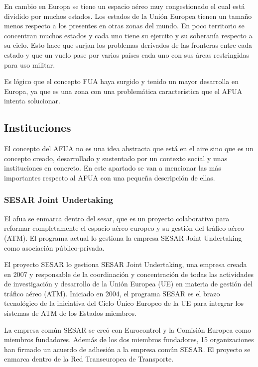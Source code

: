 En cambio en Europa se tiene un espacio aéreo muy congestionado el cual está dividido por muchos estados. Los estados de la Unión Europea tienen un tamaño menos respecto a los presentes en otras zonas del mundo. En poco territorio se concentran muchos estados y cada uno tiene su ejercito y su soberanía respecto a su cielo. Esto hace que surjan los problemas derivados de las fronteras entre cada estado y que un vuelo pase por varios países cada uno con sus áreas restringidas para uso militar.

Es lógico que el concepto FUA haya surgido y tenido un mayor desarrolla en Europa, ya que es una zona con una problemática característica que el AFUA intenta solucionar.

\subsection{Instituciones}

El concepto del AFUA no es una idea abstracta que está en el aire sino que es un concepto creado, desarrollado y sustentado por un contexto social y unas instituciones en concreto. En este apartado se van a mencionar las más importantes respecto al AFUA con una pequeña descripción de ellas.

\subsubsection{SESAR Joint Undertaking}

El \acrfull{afua} se enmarca dentro del \acrfull{sesar}, que es un proyecto colaborativo para reformar completamente el espacio aéreo europeo y su gestión del tráfico aéreo (ATM). El programa actual lo gestiona la empresa SESAR Joint Undertaking como asociación público-privada.

El proyecto SESAR lo gestiona SESAR Joint Undertaking, una empresa creada en 2007 y  responsable de la coordinación y concentración de todas las actividades de investigación y desarrollo de la Unión Europea (UE) en materia de gestión del tráfico aéreo (ATM). Iniciado en 2004, el programa SESAR es el brazo tecnológico de la iniciativa del Cielo Único Europeo de la UE para integrar los sistemas de ATM de los Estados miembros.

La empresa común SESAR se creó con Eurocontrol y la Comisión Europea como miembros fundadores. Además de los dos miembros fundadores, 15 organizaciones han firmado un acuerdo de adhesión a la empresa común SESAR. El proyecto se enmarca dentro de la Red Transeuropea de Transporte.

